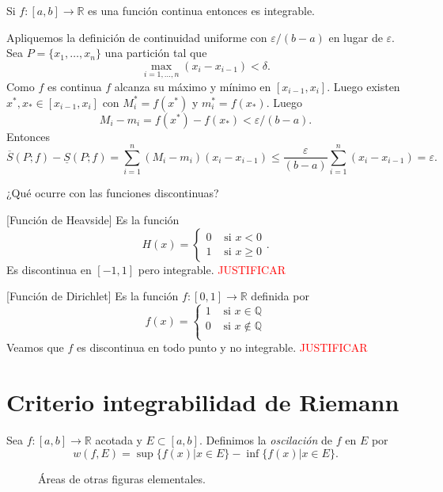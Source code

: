 \begin{teorema}{}  Si $f:[a,b]\to\mathbb{R}$ es una función continua entonces es integrable.
\end{teorema}
\begin{demo}  Apliquemos la definición de continuidad uniforme con $\varepsilon/(b-a)$ en lugar de $\varepsilon$. Sea $P=\{x_1,\ldots,x_n\}$ una partición tal que
\[
 \max_{i=1,\ldots,n}(x_i-x_{i-1})<\delta.
\]
Como $f$ es continua $f$ alcanza su máximo y mínimo en $[x_{i-1},x_i]$. Luego existen $x^*,x_*\in [x_{i-1},x_i]$ con $M_i^*=f(x^*)$ y $m_i^*=f(x_*)$.  Luego
\[
 M_i-m_i=f(x^*)-f(x_*)<\varepsilon/(b-a).
 \]
Entonces 
\[
 \overline{S}(P;f)-\underline{S}(P;f)=\sum_{i=1}^n(M_i-m_i)(x_i-x_{i-1})\leq \frac{\varepsilon}{(b-a)}\sum_{i=1}^n (x_i-x_{i-1})=\varepsilon.
\]


 \end{demo}

 
¿Qué ocurre con las funciones discontinuas? 

\begin{ejemplo}{}[Función de Heavside] Es la función
\[
 H(x)=\begin{cases}0 & \text{ si } x<0\\1 & \text{ si } x\geq 0\end{cases}.
\]
Es discontinua en $[-1,1]$ pero integrable.  \textcolor{red}{JUSTIFICAR}
 
\end{ejemplo}



\begin{ejemplo}{}[Función de Dirichlet] Es la función $f:[0,1]\to\mathbb{R}$ definida por 
\[
 f(x)=\begin{cases} 1 & \text{ si } x\in\mathbb{Q}\\0 & \text{ si }   x\notin\mathbb{Q}\\
\end{cases}
\]
Veamos que $f$ es discontinua en todo punto y no integrable. \textcolor{red}{JUSTIFICAR}
\end{ejemplo}


 \section{Criterio integrabilidad de Riemann}
 
\begin{definicion}[Oscilación]{} Sea $f:[a,b]\to\mathbb{R}$ acotada y $E\subset [a,b]$. Definimos la \emph{oscilación} de $f$ en $E$ por 
\[
 w(f,E)=\sup\{f(x)| x\in E\}-\inf\{f(x)| x\in E\}.
\]
\end{definicion}
\begin{figure}[h]
 \begin{center}

 \end{center}
 \caption{Áreas de otras figuras elementales.}\label{fig:paral-trig}
\end{figure}

